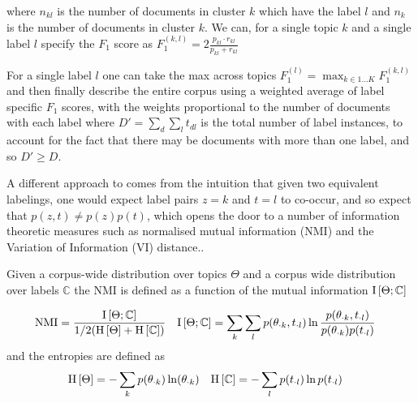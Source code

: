 where $n_{kl}$ is the number of documents in cluster $k$ which have the label $l$ and $n_k$ is the number of documents in cluster $k$. We can, for a single topic $k$ and a single label $l$ specify the $F_1$ score as $F_1^{(k,l)} = 2 \frac{p_{kl} \cdot {r_{kl}}}{p_{kl} + {r_{kl}}}$

For a single label $l$ one can take the max across topics $F_1^{(l)} = \max_{k \in 1\ldots K} F_1^{(k,l)}$ and then finally describe the entire corpus using a weighted average of label specific $F_1$ scores, with the weights proportional to the number of documents with each label where $D' = \sum_d \sum_l t_{dl}$ is the total number of label instances, to account for the fact that there may be documents with more than one label, and so $D' \geq D$.




A different approach to comes from the intuition that given two equivalent labelings, one would expect label pairs $z=k$ and $t=l$ to co-occur, and so expect that $p(z,t) \neq p(z)p(t)$, which opens the door to a number of information theoretic measures such as normalised mutual information (NMI) and the Variation of Information (VI) distance..

\newcommand{\TopDist}{\Theta}
\newcommand{\LabDist}{\mathbb{C}}
\newcommand{\NMI}{\text{NMI}}

Given a corpus-wide distribution over topics $\TopDist$ and a corpus wide distribution over labels $\LabDist$ the NMI is defined as a function of the mutual information $\mut{\TopDist}{\LabDist}$

\begin{align}
\NMI & = \frac{\mut{\TopDist}{\LabDist}}{1/2(\ent{\TopDist} + \ent{\LabDist})} &
\mut{\TopDist}{\LabDist} & = \sum_k \sum_l p(\theta_{\cdot k}, t_{\cdot l}) \ln \frac{p(\theta_{\cdot k}, t_{\cdot l})}{p(\theta_{\cdot k})p(t_{\cdot l})}
\end{align}
and the entropies are defined as
\begin{align}
\ent{\TopDist} & = - \sum_k p(\theta_{\cdot k}) \ln (\theta_{\cdot k}) &
\ent{\LabDist} & = - \sum_l p(t_{\cdot l}) \ln p(t_{\cdot l})
\end{align}

